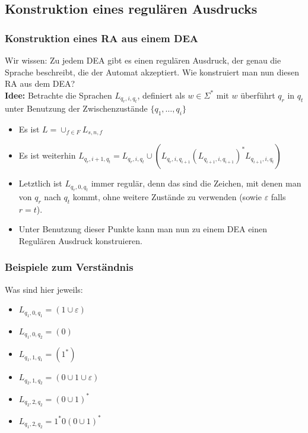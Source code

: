 \subsection{Konstruktion eines regulären Ausdrucks}
\begin{frame}
\frametitle{Konstruktion eines RA aus einem DEA}
Wir wissen: Zu jedem DEA gibt es einen regulären Ausdruck, der genau die Sprache beschreibt, die der Automat akzeptiert. Wie konstruiert man nun diesen RA aus dem DEA?\\[0.6cm]
\textbf{Idee:} Betrachte die Sprachen $L_{q_r,i,q_t}$, definiert als \( w \in \Sigma^*\) mit $w$ überführt $q_r$ in $q_t$ unter Benutzung der Zwischenzustände $\{q_1,\ldots,q_i\}$
\begin{itemize}
\item Es ist $L = \cup_{f\in F} L_{s,n,f}$
\item Es ist weiterhin $L_{q_r,i+1,q_t} = L_{q_r,i,q_t} \cup (L_{q_r,i,q_{i+1}}(L_{q_{i+1},i,q_{i+1}})^*L_{q_{i+1},i,q_t})$
\item Letztlich ist $L_{q_r, 0, q_t}$ immer regulär, denn das sind die Zeichen, mit denen man von $q_r$ nach $q_t$ kommt, ohne weitere Zustände zu verwenden (sowie $\varepsilon$ falls $r = t$).
\item Unter Benutzung dieser Punkte kann man nun zu einem DEA einen Regulären Ausdruck konstruieren.
\end{itemize}
\end{frame}
\begin{frame}
\frametitle{Beispiele zum Verständnis}
\begin{figure}[H]
\begin{center}
\end{center}
\end{figure}
Was sind hier jeweils:
\begin{itemize}
\item $L_{q_1,0,q_1}$\pause $ = (1\cup\varepsilon)$
\item $L_{q_1,0,q_2}$\pause $ = (0)$
\item $L_{q_1,1,q_1}$\pause $ = (1^*)$
\item $L_{q_2,1,q_2}$\pause $ = (0\cup1\cup\varepsilon)$
\item $L_{q_2,2,q_2}$\pause $ = (0\cup1)^*$
\item $L_{q_1,2,q_2}$\pause $ = 1^*0(0\cup1)^*$
\end{itemize}
\end{frame}

